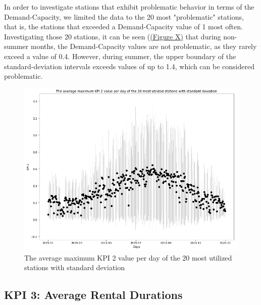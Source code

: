 In order to investigate stations that exhibit problematic behavior in terms of the Demand-Capacity, we limited the data to the 20 most "problematic" stations, that is, the stations that exceeded a Demand-Capacity value of 1 most often. Investigating those 20 stations, it can be seen (\hyperref[kpi2abb6]{(Figure X)} that during non-summer months, the Demand-Capacity values are not problematic, as they rarely exceed a value of 0.4. However, during summer, the upper boundary of the standard-deviation intervals exceeds values of up to 1.4, which can be considered problematic.

\begin{figure}[H]
   \centering
    \includegraphics[width=0.75\linewidth]{./Figures/kpi2abb6.png}
    \caption{The average maximum KPI 2 value per day of the 20 most utilized stations with standard deviation}
    \label{kpi2abb6}
\end{figure}

\subsection{KPI 3: Average Rental Durations}
\label{subsec:KPI3}


